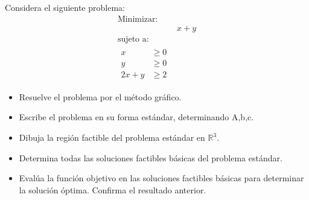 \documentclass{article}
\begin{document}
Considera el siguiente problema:
\begin{equation*}
\begin{aligned}
  \text{Minimizar:}\quad & \quad\\
  &x+y\\
  \text{sujeto a:}\quad & \quad \\
  \begin{aligned}
    x & \geq 0\\
    y & \geq 0\\
    2x+y& \geq 2
  \end{aligned}
\end{aligned}
\end{equation*}
\begin{itemize}
\item Resuelve el problema por el método gráfico.
\item Escribe el problema en su forma estándar, determinando A,b,c.
\item Dibuja la región factible del problema estándar en $\mathbb{R}^3$.
\item Determina todas las soluciones factibles básicas del problema
estándar.
\item Evalúa la función objetivo en las soluciones factibles básicas
para determinar la solución óptima. Confirma el resultado anterior.
\end{itemize}
\end{document}
